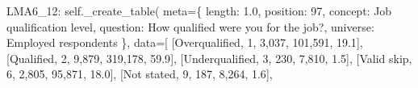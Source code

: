 \documentclass[
  11pt,
  a4paper,
]{article}
\newenvironment{Shaded}{\begin{snugshade}}{\end{snugshade}}
\newcommand{\NormalTok}[1]{\textcolor[rgb]{0.00,0.23,0.31}{#1}}
\newcommand{\OperatorTok}[1]{\textcolor[rgb]{0.37,0.37,0.37}{#1}}
\newcommand{\StringTok}[1]{\textcolor[rgb]{0.13,0.47,0.30}{#1}}
\newcommand{\VariableTok}[1]{\textcolor[rgb]{0.07,0.07,0.07}{#1}}
\begin{document}
\begin{Shaded}
\begin{Highlighting}[]
            \StringTok{\textquotesingle{}LMA6\_12\textquotesingle{}}\NormalTok{: }\VariableTok{self}\NormalTok{.\_create\_table(}
\NormalTok{                meta}\OperatorTok{=}\NormalTok{\{}
                    \StringTok{\textquotesingle{}length\textquotesingle{}}\NormalTok{: }\StringTok{\textquotesingle{}1.0\textquotesingle{}}\NormalTok{, }\StringTok{\textquotesingle{}position\textquotesingle{}}\NormalTok{: }\StringTok{\textquotesingle{}97\textquotesingle{}}\NormalTok{,}
                    \StringTok{\textquotesingle{}concept\textquotesingle{}}\NormalTok{: }\StringTok{\textquotesingle{}Job qualification level\textquotesingle{}}\NormalTok{,}
                    \StringTok{\textquotesingle{}question\textquotesingle{}}\NormalTok{: }\StringTok{\textquotesingle{}How qualified were you for the job?\textquotesingle{}}\NormalTok{,}
                    \StringTok{\textquotesingle{}universe\textquotesingle{}}\NormalTok{: }\StringTok{\textquotesingle{}Employed respondents\textquotesingle{}}
\NormalTok{                \},}
\NormalTok{                data}\OperatorTok{=}\NormalTok{[}
\NormalTok{                    [}\StringTok{\textquotesingle{}Overqualified\textquotesingle{}}\NormalTok{, }\StringTok{\textquotesingle{}1\textquotesingle{}}\NormalTok{, }\StringTok{\textquotesingle{}3,037\textquotesingle{}}\NormalTok{, }\StringTok{\textquotesingle{}101,591\textquotesingle{}}\NormalTok{, }\StringTok{\textquotesingle{}19.1\textquotesingle{}}\NormalTok{],}
\NormalTok{                    [}\StringTok{\textquotesingle{}Qualified\textquotesingle{}}\NormalTok{, }\StringTok{\textquotesingle{}2\textquotesingle{}}\NormalTok{, }\StringTok{\textquotesingle{}9,879\textquotesingle{}}\NormalTok{, }\StringTok{\textquotesingle{}319,178\textquotesingle{}}\NormalTok{, }\StringTok{\textquotesingle{}59.9\textquotesingle{}}\NormalTok{],}
\NormalTok{                    [}\StringTok{\textquotesingle{}Underqualified\textquotesingle{}}\NormalTok{, }\StringTok{\textquotesingle{}3\textquotesingle{}}\NormalTok{, }\StringTok{\textquotesingle{}230\textquotesingle{}}\NormalTok{, }\StringTok{\textquotesingle{}7,810\textquotesingle{}}\NormalTok{, }\StringTok{\textquotesingle{}1.5\textquotesingle{}}\NormalTok{],}
\NormalTok{                    [}\StringTok{\textquotesingle{}Valid skip\textquotesingle{}}\NormalTok{, }\StringTok{\textquotesingle{}6\textquotesingle{}}\NormalTok{, }\StringTok{\textquotesingle{}2,805\textquotesingle{}}\NormalTok{, }\StringTok{\textquotesingle{}95,871\textquotesingle{}}\NormalTok{, }\StringTok{\textquotesingle{}18.0\textquotesingle{}}\NormalTok{],}
\NormalTok{                    [}\StringTok{\textquotesingle{}Not stated\textquotesingle{}}\NormalTok{, }\StringTok{\textquotesingle{}9\textquotesingle{}}\NormalTok{, }\StringTok{\textquotesingle{}187\textquotesingle{}}\NormalTok{, }\StringTok{\textquotesingle{}8,264\textquotesingle{}}\NormalTok{, }\StringTok{\textquotesingle{}1.6\textquotesingle{}}\NormalTok{],}

\end{Highlighting}
\end{Shaded}
\end{document}

